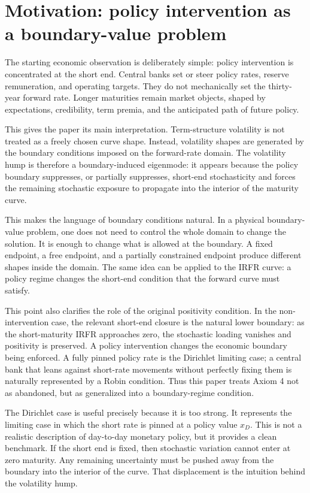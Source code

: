 \documentclass[11pt]{article}
\numberwithin{equation}{section}
\begin{document}
\section{Motivation: policy intervention as a boundary-value problem}

The starting economic observation is deliberately simple: policy intervention is concentrated at the short end. Central banks set or steer policy rates, reserve remuneration, and operating targets. They do not mechanically set the thirty-year forward rate. Longer maturities remain market objects, shaped by expectations, credibility, term premia, and the anticipated path of future policy.

This gives the paper its main interpretation. Term-structure volatility is not treated as a freely chosen curve shape. Instead, volatility shapes are generated by the boundary conditions imposed on the forward-rate domain. The volatility hump is therefore a boundary-induced eigenmode: it appears because the policy boundary suppresses, or partially suppresses, short-end stochasticity and forces the remaining stochastic exposure to propagate into the interior of the maturity curve.

This makes the language of boundary conditions natural. In a physical boundary-value problem, one does not need to control the whole domain to change the solution. It is enough to change what is allowed at the boundary. A fixed endpoint, a free endpoint, and a partially constrained endpoint produce different shapes inside the domain. The same idea can be applied to the IRFR curve: a policy regime changes the short-end condition that the forward curve must satisfy.

This point also clarifies the role of the original positivity condition. In the non-intervention case, the relevant short-end closure is the natural lower boundary: as the short-maturity IRFR approaches zero, the stochastic loading vanishes and positivity is preserved. A policy intervention changes the economic boundary being enforced. A fully pinned policy rate is the Dirichlet limiting case; a central bank that leans against short-rate movements without perfectly fixing them is naturally represented by a Robin condition. Thus this paper treats Axiom 4 not as abandoned, but as generalized into a boundary-regime condition.

The Dirichlet case is useful precisely because it is too strong. It represents the limiting case in which the short rate is pinned at a policy value $x_D$. This is not a realistic description of day-to-day monetary policy, but it provides a clean benchmark. If the short end is fixed, then stochastic variation cannot enter at zero maturity. Any remaining uncertainty must be pushed away from the boundary into the interior of the curve. That displacement is the intuition behind the volatility hump.
\end{document}
